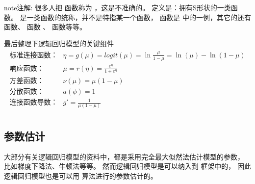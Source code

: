 \documentclass[letterpaper,10pt,english]{sphinxmanual}
\begin{document}
\begin{sphinxadmonition}{note}{注解:}
很多人把  函数称为 ，这是不准确的。
 定义是：拥有S形状的一类函数。 是一类函数的统称，并不是特指某一个函数，
 函数是  中的一例，其它的还有  函数、
 函数
、 函数等等。
\end{sphinxadmonition}

最后整理下逻辑回归模型的关键组件
\begin{align}\label{equation:二项模型/content:二项模型/content:12}\!\begin{aligned}
\text{标准连接函数：}  & \eta = g(\mu) =  logit(\mu) = \ln  \frac{\mu}{1-\mu} = \ln(\mu) - \ln(1-\mu)\\
\text{响应函数：}  & \mu = r(\eta) = \frac{e^{\eta}}{1+e^{\eta}}\\
\text{方差函数：}  & \nu(\mu) = \mu(1-\mu)\\
\text{分散函数：}  & a(\phi) = 1\\
\text{连接函数导数：} & g'= \frac{1}{\mu(1-\mu)}\\
\end{aligned}\end{align}

\subsection{参数估计}
\label{\detokenize{_u4e8c_u9879_u6a21_u578b/content:id5}}
大部分有关逻辑回归模型的资料中，都是采用完全最大似然法估计模型的参数，
比如梯度下降法、牛顿法等等。
然而逻辑回归模型是可以纳入到  框架中的，
因此逻辑回归模型也是可以用  算法进行的参数估计的。
\end{document}
